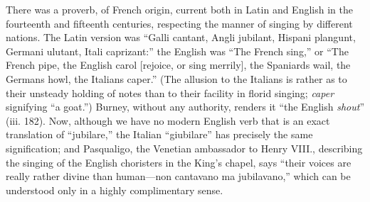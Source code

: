 There was a proverb, of French origin, current both in Latin and English in
the fourteenth and fifteenth centuries, respecting the manner of singing by different
nations. The Latin version was “Galli cantant, Angli jubilant, Hispani
plangunt, Germani ulutant, Itali caprizant:” the English was “The French
sing,” or “The French pipe, the English carol [rejoice, or sing merrily], the
Spaniards wail, the Germans howl, the Italians caper.” (The allusion to the
Italians is rather as to their unsteady holding of notes than to their facility in
florid singing; \textit{caper} signifying “a goat.”) Burney, without any authority,
renders it “the English \textit{shout}” (iii. 182). Now, although we have no modern
English verb that is an exact translation of “jubilare,” the Italian “giubilare”
has precisely the same signification; and Pasqualigo, the Venetian ambassador
to Henry VIII., describing the singing of the English choristers in the King’s
chapel, says “their voices are really rather divine than human—non cantavano
ma jubilavano,” which can be understood only in a highly complimentary sense.

